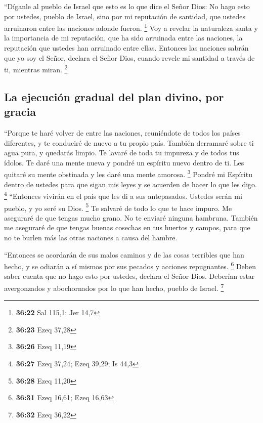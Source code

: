  ``Díganle al pueblo de Israel que esto es lo que dice el
Señor Dios: No hago esto por ustedes, pueblo de Israel, sino por mi
reputación de santidad, que ustedes arruinaron entre las naciones adonde
fueron. \footnote{\textbf{36:22} Sal 115,1; Jer 14,7} 
Voy a revelar la naturaleza santa y la importancia de mi reputación, que
ha sido arruinada entre las naciones, la reputación que ustedes han
arruinado entre ellas. Entonces las naciones sabrán que yo soy el Señor,
declara el Señor Dios, cuando revele mi santidad a través de ti,
mientras miran. \footnote{\textbf{36:23} Ezeq 37,28}

\hypertarget{la-ejecuciuxf3n-gradual-del-plan-divino-por-gracia}{%
\subsection{La ejecución gradual del plan divino, por
gracia}\label{la-ejecuciuxf3n-gradual-del-plan-divino-por-gracia}}

 ``Porque te haré volver de entre las naciones,
reuniéndote de todos los países diferentes, y te conduciré de nuevo a tu
propio país.  También derramaré sobre ti agua pura, y
quedarás limpio. Te lavaré de toda tu impureza y de todos tus ídolos.
 Te daré una mente nueva y pondré un espíritu nuevo
dentro de ti. Les quitaré su mente obstinada y les daré una mente
amorosa. \footnote{\textbf{36:26} Ezeq 11,19}  Pondré mi
Espíritu dentro de ustedes para que sigan mis leyes y se acuerden de
hacer lo que les digo. \footnote{\textbf{36:27} Ezeq 37,24; Ezeq 39,29;
  Is 44,3}  ``Entonces vivirán en el país que les di a
sus antepasados. Ustedes serán mi pueblo, y yo seré su Dios. \footnote{\textbf{36:28}
  Ezeq 11,20}  Te salvaré de todo lo que te hace impuro.
Me aseguraré de que tengas mucho grano. No te enviaré ninguna hambruna.
 También me aseguraré de que tengas buenas cosechas en
tus huertos y campos, para que no te burlen más las otras naciones a
causa del hambre.

 ``Entonces se acordarán de sus malos caminos y de las
cosas terribles que han hecho, y se odiarán a sí mismos por sus pecados
y acciones repugnantes. \footnote{\textbf{36:31} Ezeq 16,61; Ezeq 16,63}
 Deben saber cuenta que no hago esto por ustedes, declara
el Señor Dios. Deberían estar avergonzados y abochornados por lo que han
hecho, pueblo de Israel. \footnote{\textbf{36:32} Ezeq 36,22}


